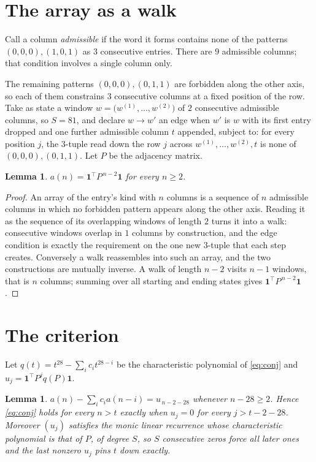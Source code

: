 \documentclass[11pt,a4paper]{article}
\theoremstyle{plain}
\newtheorem{lemma}[theorem]{Lemma}
\theoremstyle{definition}
\begin{document}
\section{The array as a walk}

Call a column \emph{admissible} if the word it forms contains none of the patterns
$(0,0,0), (1,0,1)$ as $3$ consecutive entries. There are $9$ admissible columns; that condition
involves a single column only.

The remaining patterns $(0,0,0), (0,1,1)$ are forbidden along the other axis, so each of them
constrains $3$ consecutive columns at a fixed position of the row. Take as state a
window $w=\bigl(w^{(1)},\dots,w^{(2)}\bigr)$ of $2$ consecutive admissible
columns, so $S=81$, and declare $w\to w'$ an edge when $w'$ is $w$ with its first entry
dropped and one further admissible column $t$ appended, subject to: for every position
$j$, the $3$-tuple read down the row $j$ across $w^{(1)},\dots,w^{(2)},t$
is none of $(0,0,0), (0,1,1)$. Let $P$ be the adjacency matrix.

\begin{lemma}\label{lem:walk}
$a(n)=\mathbf{1}^{\!\top}P^{\,n-2}\mathbf{1}$ for every $n\ge2$.
\end{lemma}

\begin{proof}
An array of the entry's kind with $n$ columns is a sequence of $n$ admissible columns in
which no forbidden pattern appears along the other axis. Reading it as the sequence of its
overlapping windows of length $2$ turns it into a walk: consecutive windows overlap in
$1$ columns by construction, and the edge condition is exactly the requirement on the one
new $3$-tuple that each step creates. Conversely a walk reassembles into such an array,
and the two constructions are mutually inverse. A walk of length $n-2$ visits $n-1$
windows, that is $n$ columns; summing over all starting and ending states gives
$\mathbf{1}^{\!\top}P^{\,n-2}\mathbf{1}$.
\end{proof}

\section{The criterion}

Let $q(t)=t^{28}-\sum_i c_i t^{28-i}$ be the characteristic polynomial of
\eqref{eq:conj} and $u_j=\mathbf{1}^{\!\top}P^{j}q(P)\mathbf{1}$.

\begin{lemma}\label{lem:crit}
$a(n)-\sum_i c_i a(n-i)=u_{\,n-2-28}$ whenever $n-28\ge2$. Hence
\eqref{eq:conj} holds for every $n>t$ exactly when $u_j=0$ for every
$j>t-2-28$. Moreover $(u_j)$ satisfies the monic linear recurrence whose
characteristic polynomial is that of $P$, of degree $S$, so $S$ consecutive zeros force all
later ones and the last nonzero $u_j$ pins $t$ down exactly.
\end{lemma}
\end{document}
